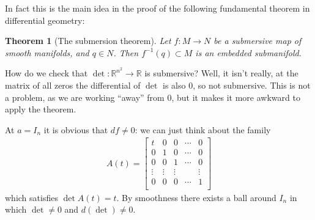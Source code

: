 \documentclass[12pt]{article}
\theoremstyle{plain}
\newtheorem{thm}{Theorem}[section]
\theoremstyle{definition}
\numberwithin{equation}{section}
\newcommand{\R}{\mathbb{R}}
\begin{document}
{In fact this is the main idea in the proof of the following fundamental theorem in differential geometry:
\begin{thm}[The submersion theorem]
Let $f : M \rightarrow N$ be a submersive map of smooth manifolds, and $q \in N$. Then $f^{-1}(q) \subset M$ is an embedded submanifold.
\end{thm}



How do we check that $\det : \R^{n^2} \rightarrow \R$ is submersive? Well, it isn't really, at the matrix of all zeros the differential of $\det$ is also $0$, so not submersive. This is not a problem, as we are working ``away'' from $0$, but it makes it more awkward to apply the theorem.

At $a = I_n$ it is obvious that $df \neq 0$: we can just think about the family
\begin{align*}
A(t) = \left[
\begin{array}{ccccc}
t & 0 & 0 & \cdots & 0 \\
%
0 & 1 & 0 & \cdots & 0 \\
%
0 & 0 & 1 & \cdots & 0 \\
%
\vdots & \vdots & \vdots &  & \vdots \\
%
0 & 0 & 0 & \cdots & 1 \\
\end{array}
\right]
\end{align*}
which satisfies $\det A(t) = t$. By smoothness there exists a ball around $I_n$ in which $\det \neq 0$ and $d(\det) \neq 0$.


}
\end{document}
